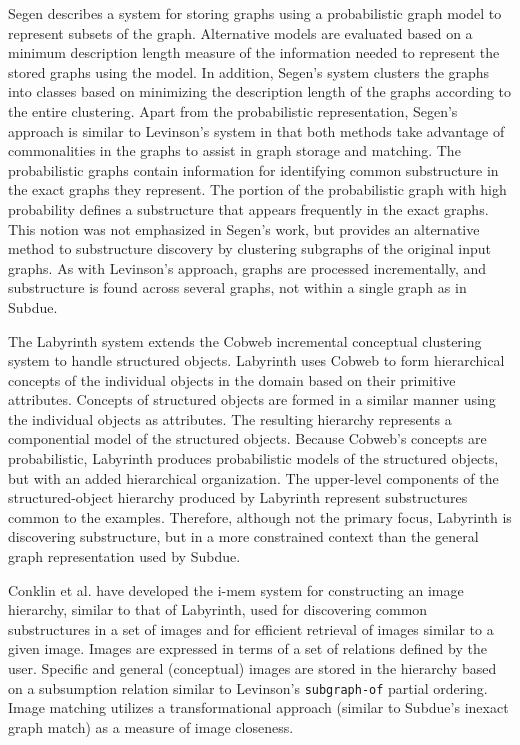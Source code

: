 Segen \cite{segen/ml90} describes a system for storing graphs using a
probabilistic graph model to represent subsets of the graph.  Alternative
models are evaluated based on a minimum description length measure of the
information needed to represent the stored graphs using the model.  In
addition, Segen's system clusters the graphs into classes based on
minimizing the description length of the graphs according to the entire
clustering.  Apart from the probabilistic representation, Segen's approach
is similar to Levinson's system in that both methods take advantage of
commonalities in the graphs to assist in graph storage and matching.  The
probabilistic graphs contain information for identifying common
substructure in the exact graphs they represent.  The portion of the
probabilistic graph with high probability defines a substructure that
appears frequently in the exact graphs.  This notion was not emphasized in
Segen's work, but provides an alternative method to substructure discovery
by clustering subgraphs of the original input graphs.  As with Levinson's
approach, graphs are processed incrementally, and substructure is found
across several graphs, not within a single graph as in {\sc Subdue}.

The {\sc Labyrinth} system \cite{thompson/91} extends the {\sc Cobweb}
incremental conceptual clustering system \cite{F87} to handle
structured objects.  {\sc Labyrinth} uses {\sc Cobweb} to form hierarchical
concepts of the individual objects in the domain based on their primitive
attributes.  Concepts of structured objects are formed in a similar manner
using the individual objects as attributes.  The resulting hierarchy
represents a componential model of the structured objects.  Because {\sc
Cobweb}'s concepts are probabilistic, {\sc Labyrinth} produces
probabilistic models of the structured objects, but with an added
hierarchical organization.  The upper-level components of the
structured-object hierarchy produced by {\sc Labyrinth} represent
substructures common to the examples.  Therefore, although not the primary
focus, {\sc Labyrinth} is discovering substructure, but in a more
constrained context than the general graph representation used by {\sc
Subdue}.

Conklin et al. \cite{conklin/mlw92} have developed the {\sc i-mem} system for
constructing an image hierarchy, similar to that of {\sc Labyrinth}, used
for discovering common substructures in a set of images and for efficient
retrieval of images similar to a given image.  Images are expressed in
terms of a set of relations defined by the user.  Specific and general
(conceptual) images are stored in the hierarchy based on a subsumption
relation similar to Levinson's {\tt subgraph-of} partial ordering.  Image
matching utilizes a transformational approach (similar to {\sc Subdue}'s
inexact graph match) as a measure of image closeness.

